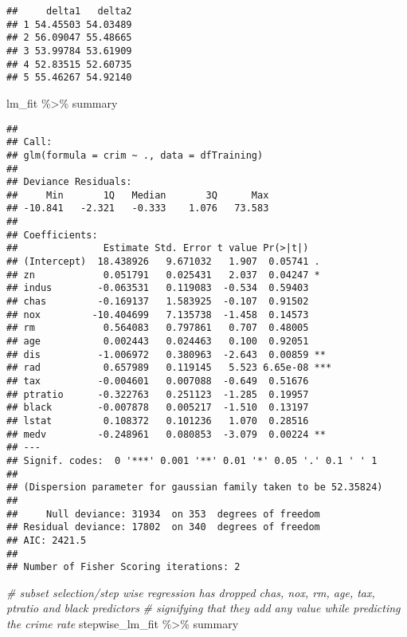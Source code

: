 \documentclass[
]{article}
\newenvironment{Shaded}{\begin{snugshade}}{\end{snugshade}}
\newcommand{\CommentTok}[1]{\textcolor[rgb]{0.56,0.35,0.01}{\textit{#1}}}
\newcommand{\NormalTok}[1]{#1}
\newcommand{\SpecialCharTok}[1]{\textcolor[rgb]{0.00,0.00,0.00}{#1}}
\begin{document}
\begin{verbatim}
##     delta1   delta2
## 1 54.45503 54.03489
## 2 56.09047 55.48665
## 3 53.99784 53.61909
## 4 52.83515 52.60735
## 5 55.46267 54.92140
\end{verbatim}

\begin{Shaded}
\begin{Highlighting}[]
\NormalTok{lm\_fit }\SpecialCharTok{\%\textgreater{}\%}\NormalTok{ summary}
\end{Highlighting}
\end{Shaded}

\begin{verbatim}
## 
## Call:
## glm(formula = crim ~ ., data = dfTraining)
## 
## Deviance Residuals: 
##     Min       1Q   Median       3Q      Max  
## -10.841   -2.321   -0.333    1.076   73.583  
## 
## Coefficients:
##               Estimate Std. Error t value Pr(>|t|)    
## (Intercept)  18.438926   9.671032   1.907  0.05741 .  
## zn            0.051791   0.025431   2.037  0.04247 *  
## indus        -0.063531   0.119083  -0.534  0.59403    
## chas         -0.169137   1.583925  -0.107  0.91502    
## nox         -10.404699   7.135738  -1.458  0.14573    
## rm            0.564083   0.797861   0.707  0.48005    
## age           0.002443   0.024463   0.100  0.92051    
## dis          -1.006972   0.380963  -2.643  0.00859 ** 
## rad           0.657989   0.119145   5.523 6.65e-08 ***
## tax          -0.004601   0.007088  -0.649  0.51676    
## ptratio      -0.322763   0.251123  -1.285  0.19957    
## black        -0.007878   0.005217  -1.510  0.13197    
## lstat         0.108372   0.101236   1.070  0.28516    
## medv         -0.248961   0.080853  -3.079  0.00224 ** 
## ---
## Signif. codes:  0 '***' 0.001 '**' 0.01 '*' 0.05 '.' 0.1 ' ' 1
## 
## (Dispersion parameter for gaussian family taken to be 52.35824)
## 
##     Null deviance: 31934  on 353  degrees of freedom
## Residual deviance: 17802  on 340  degrees of freedom
## AIC: 2421.5
## 
## Number of Fisher Scoring iterations: 2
\end{verbatim}

\begin{Shaded}
\begin{Highlighting}[]
\CommentTok{\# subset selection/step wise regression has dropped chas, nox, rm, age, tax, ptratio and black predictors}
\CommentTok{\# signifying that they add any value while predicting the crime rate}
\NormalTok{stepwise\_lm\_fit }\SpecialCharTok{\%\textgreater{}\%}\NormalTok{ summary}
\end{Highlighting}
\end{Shaded}
\end{document}
